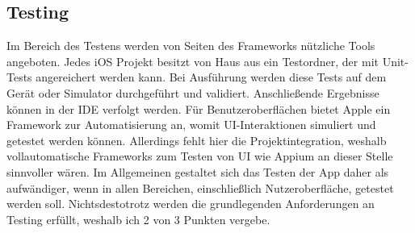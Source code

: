 \subsection{Testing}
Im Bereich des Testens werden von Seiten des Frameworks nützliche Tools angeboten. Jedes iOS Projekt besitzt von Haus aus ein Testordner, der mit Unit-Tests angereichert werden kann. Bei Ausführung werden diese Tests auf dem Gerät oder Simulator durchgeführt und validiert. An\-schlie\-ßende Ergebnisse können in der IDE verfolgt werden. Für Benutzeroberflächen bietet Apple ein Framework zur Automatisierung an, womit UI-Interaktionen simuliert und getestet werden können. Allerdings fehlt hier die Projektintegration, weshalb vollautomatische Frameworks zum Testen von UI wie Appium an dieser Stelle sinnvoller wären. Im Allgemeinen gestaltet sich das Testen der App daher als aufwändiger, wenn in allen Bereichen, einschließlich Nutzeroberfläche, getestet werden soll. Nichtsdestotrotz werden die grundlegenden Anforderungen an Testing erfüllt, weshalb ich 2 von 3 Punkten vergebe.
